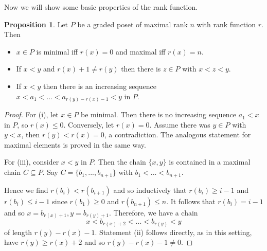 \documentclass{scrartcl}
\theoremstyle{definition}
\newtheorem{proposition}[definition]{Proposition}
\begin{document}
Now we will show some basic properties of the rank function.
\begin{proposition}
    Let $P$ be a graded poset of maximal rank $n$ with rank function $r$.
    Then
    \begin{itemize}
        \item $x \in P$ is minimal iff $r(x) = 0$ and maximal iff $r(x) = n$.
        \item If $x < y$ and $r(x) + 1 \neq r(y)$ then there is $z \in P$ with $x < z < y$.
        \item If $x < y$ then there is an increasing sequence $x < a_1 < ... < a_{r(y) - r(x) - 1} < y$ in $P$. 
    \end{itemize}
\end{proposition}
\begin{proof}
    For (i), let $x \in P$ be minimal. Then there is no increasing sequence $a_1 < x$ in $P$, so $r(x) \leq 0$.
    Conversely, let $r(x) = 0$. Assume there was $y \in P$ with $y < x$, then $r(y) < r(x) = 0$, a contradiction.
    The analogous statement for maximal elements is proved in the same way.
    
    For (iii), consider $x < y$ in $P$. Then the chain $\{ x, y \}$ is contained in a maximal chain $C \subseteq P$.
    Say $C = \{ b_1, ..., b_{n + 1} \}$ with $b_1 < ... < b_{n + 1}$.

    Hence we find $r(b_i) < r(b_{i + 1})$ and so inductively that $r(b_i) \geq i - 1$ and $r(b_i) \leq i - 1$ since $r(b_1) \geq 0$ and $r(b_{n + 1}) \leq n$.
    It follows that $r(b_i) = i - 1$ and so $x = b_{r(x) + 1}, y = b_{r(y) + 1}$.
    Therefore, we have a chain
    \begin{equation*}
        x < b_{r(x) + 2} < ... < b_{r(y)} < y
    \end{equation*}
    of length $r(y) - r(x) - 1$.
    Statement (ii) follows directly, as in this setting, have $r(y) \geq r(x) + 2$ and so $r(y) - r(x) - 1 \neq 0$.
\end{proof}
\end{document}
